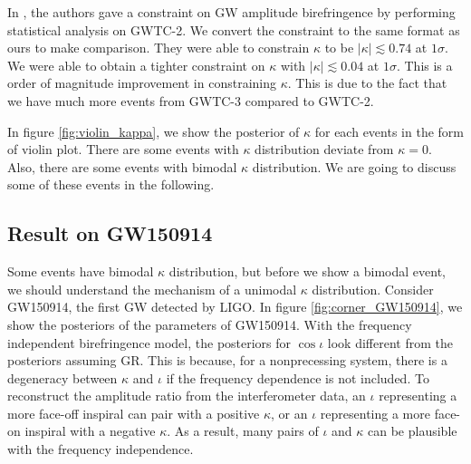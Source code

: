 \documentclass[aps,prd,twocolumn,superscriptaddress,preprintnumbers,floatfix,nofootinbib]{revtex4-2}
\begin{document}
In \citet{Okounkova_2022}, the authors gave a constraint on GW amplitude birefringence by performing statistical analysis on GWTC-2.
We convert the constraint to the same format as ours to make comparison.
They were able to constrain $\kappa$ to be $|\kappa| \lesssim 0.74$ at $1 \sigma$.
We were able to obtain a tighter constraint on $\kappa$ with $|\kappa| \lesssim 0.04$ at $1 \sigma$.
This is a order of magnitude improvement in constraining $\kappa$.
This is due to the fact that we have much more events from GWTC-3 compared to GWTC-2.

In figure \ref{fig:violin_kappa}, we show the posterior of $\kappa$ for each events in the form of violin plot.
There are some events with $\kappa$ distribution deviate from $\kappa=0$.
Also, there are some events with bimodal $\kappa$ distribution.
We are going to discuss some of these events in the following.





\subsection{Result on GW150914}
Some events have bimodal $\kappa$ distribution, but before we show a bimodal event, we should understand the mechanism of a unimodal $\kappa$ distribution.
Consider GW150914, the first GW detected by LIGO.
In figure \ref{fig:corner_GW150914}, we show the posteriors of the parameters of GW150914.
With the frequency independent birefringence model, the posteriors for $\cos\iota$ look different from the posteriors assuming GR.
This is because, for a nonprecessing system, there is a degeneracy between $\kappa$ and $\iota$ if the frequency dependence is not included.
To reconstruct the amplitude ratio from the interferometer data, an $\iota$ representing a more face-off inspiral can pair with a positive $\kappa$, or an $\iota$ representing a more face-on inspiral with a negative $\kappa$.
As a result, many pairs of $\iota$ and $\kappa$ can be plausible with the frequency independence.
\end{document}

